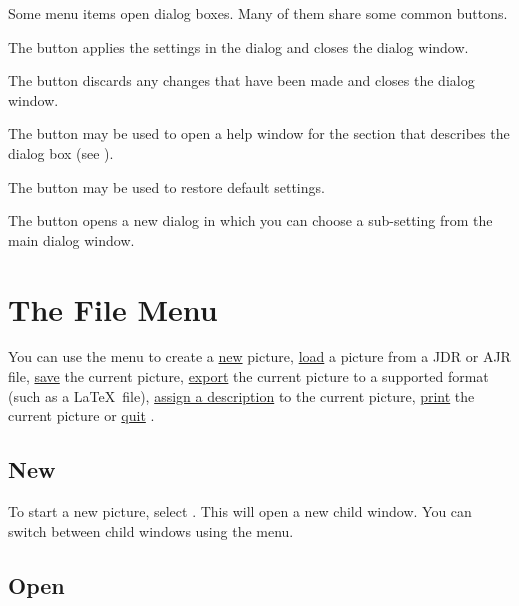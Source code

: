 Some menu items open dialog boxes. Many of them share some common
buttons.


The  button applies the settings in the dialog and
closes the dialog window.


The  button discards any changes that have been made
and closes the dialog window.


The  button may be used to open a help
window for the section that describes the dialog box (see
).


The  button may be used to restore default
settings.


The  button opens a new dialog in which you
can choose a sub-setting from the main dialog window.

\chapter{The File Menu}\label{sec:filemenu}


You can use the  menu to create a
\hyperref[sec:newimage]{new} picture,
\hyperref[sec:loadimage]{load} a picture from a
\gls{JDR} or \gls{AJR} file,
\hyperref[sec:saveimage]{save} the current picture,
\hyperref[sec:exportimage]{export} the current
picture to a supported format (such as a \LaTeX\ file),
\hyperref[sec:imagedescription]{assign a description} to the
current picture, \hyperref[sec:print]{print} the
current picture or \hyperref[sec:quit]{quit} \FlowframTk.

\section{New}\label{sec:newimage}


To start a new picture, select . This will open
a new child window. You can switch between child windows using the
 menu.

\section{Open}\label{sec:loadimage}

